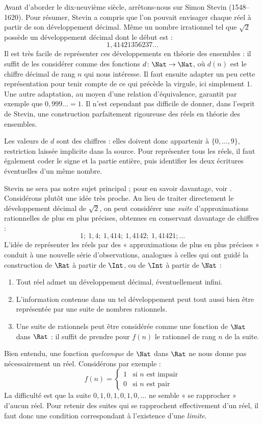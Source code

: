 \documentclass[11pt,a4paper,openany]{memoir}
\begin{document}
Avant d'aborder le dix-neuvième siècle, arrêtons-nous sur Simon Stevin
(1548--1620). Pour résumer, Stevin a compris que l'on pouvait envisager
chaque réel à partir de son développement décimal. Même un nombre
irrationnel tel que $\sqrt{2}$ possède un développement décimal dont
le début est :
\[
1{,}41421356237\ldots
\]
Il est très facile de représenter ces développements en théorie des
ensembles : il suffit de les considérer comme des fonctions
$d \colon \Nat \to \Nat$, où $d(n)$ est le chiffre décimal de rang $n$
qui nous intéresse. Il faut ensuite adapter un peu cette représentation
pour tenir compte de ce qui précède la virgule, ici simplement $1$.
Une autre adaptation, au moyen d'une relation d'équivalence, garantit
par exemple que $0{,}999\ldots=1$. Il n'est cependant pas difficile de
donner, dans l'esprit de Stevin, une construction parfaitement rigoureuse
des réels en théorie des ensembles.
\begin{editorial}
Les valeurs de $d$ sont des chiffres : elles doivent donc appartenir à
$\{0,\ldots,9\}$, restriction laissée implicite dans la source. Pour
représenter tous les réels, il faut également coder le signe et la partie
entière, puis identifier les deux écritures éventuelles d'un même nombre.
\end{editorial}

Stevin ne sera pas notre sujet principal ; pour en savoir davantage,
voir \citealt{KatzKatz2012}. Considérons plutôt une idée très proche.
Au lieu de traiter directement le développement décimal de $\sqrt{2}$,
on peut considérer une \emph{suite} d'approximations rationnelles de
plus en plus précises, obtenues en conservant davantage de chiffres :
\[
1;\ 1{,}4;\ 1{,}414;\ 1{,}4142;\ 1{,}41421;\ldots
\]
L'idée de représenter les réels par des « approximations de plus en
plus précises » conduit à une nouvelle série d'observations, analogues
à celles qui ont guidé la construction de $\Rat$ à partir de $\Int$,
ou de $\Int$ à partir de $\Nat$ :
\begin{enumerate}
\item Tout réel admet un développement décimal, éventuellement infini.
\item L'information contenue dans un tel développement peut tout aussi
bien être représentée par une suite de nombres rationnels.
\item Une suite de rationnels peut être considérée comme une fonction
de $\Nat$ dans $\Rat$ : il suffit de prendre pour $f(n)$ le rationnel
de rang $n$ de la suite.
\end{enumerate}
Bien entendu, une fonction \emph{quelconque} de $\Nat$ dans $\Rat$
ne nous donne pas nécessairement un réel. Considérons par exemple :
\[
f(n)=\begin{cases}
1 &\text{si }n\text{ est impair}\\
0 &\text{si }n\text{ est pair}
\end{cases}
\]
La difficulté est que la suite $0,1,0,1,0,1,0,\ldots$ ne semble
« se rapprocher » d'aucun réel. Pour retenir des suites qui se rapprochent
effectivement d'un réel, il faut donc une condition correspondant à
l'existence d'une \emph{limite}.
\end{document}

